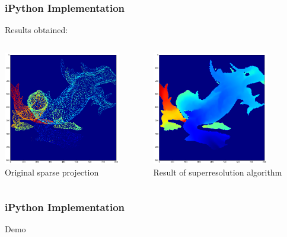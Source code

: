 \documentclass{beamer}
\begin{document}
\begin{frame}
\frametitle{iPython Implementation}
	Results obtained:
	\begin{columns}
	\begin{column}[T]{.5\textwidth}
		\includegraphics[height=5cm]{res2.png}
		\\ Original sparse projection
	\end{column}
	\begin{column}[T]{.5\textwidth}
		\includegraphics[height=5cm]{res2d.png}
		\\ Result of superresolution algorithm
	\end{column}
	\end{columns}
\end{frame}


\begin{frame}
\frametitle{iPython Implementation}
	\huge{Demo}
\end{frame}
\end{document}
